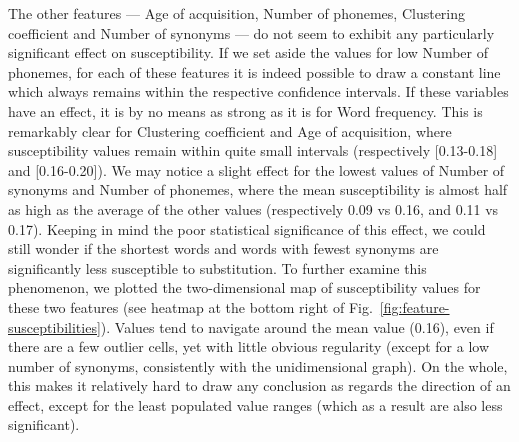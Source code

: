 The other features --- Age of acquisition, Number of phonemes, Clustering coefficient and Number of synonyms --- do not seem to exhibit any particularly significant effect on susceptibility.
{If we set aside the values for low Number of phonemes}, for each of these features it is indeed possible to draw a constant line which always remains within the respective confidence intervals.
If these variables have an effect, it is by no means as strong as it is for Word frequency.
This is remarkably clear for Clustering coefficient and Age of acquisition, where susceptibility values remain within quite small intervals (respectively [0.13-0.18] and [0.16-0.20]).
{We may notice a slight effect for the lowest values of Number of synonyms and Number of phonemes, where the mean susceptibility is almost half as high as the average of the other values (respectively 0.09 vs 0.16, and 0.11 vs 0.17).}
Keeping in mind the poor statistical significance of this effect, we could still wonder if the shortest words and words with fewest synonyms are significantly less susceptible to substitution.
To further examine this phenomenon, we plotted the two-dimensional map of susceptibility values for these two features (see heatmap at the bottom right of Fig.~\ref{fig:feature-susceptibilities}).
Values tend to navigate around the mean value (0.16), even if there are a few outlier cells, yet with little obvious regularity (except for a low number of synonyms, consistently with the unidimensional graph). {On the whole, this makes it relatively hard to draw any conclusion as regards the direction of an effect, except for the least populated value ranges (which as a result are also less significant).}


